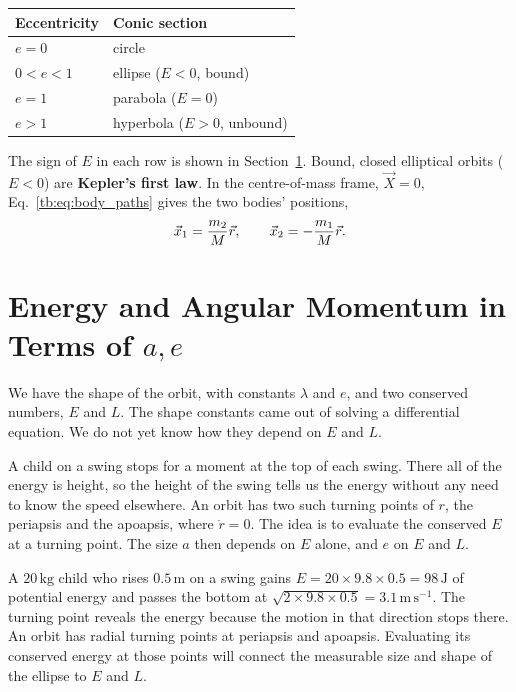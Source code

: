 	\begin{center}
		\begin{tabular}{@{}ll@{}}
			\toprule
			Eccentricity & Conic section\\
			\midrule
			$e=0$ & circle\\
			$0<e<1$ & ellipse ($E<0$, bound)\\
			$e=1$ & parabola ($E=0$)\\
			$e>1$ & hyperbola ($E>0$, unbound)\\
			\bottomrule
		\end{tabular}
	\end{center}
	The sign of $E$ in each row is shown in Section~\ref{tb:sec:EL_ae}. Bound, closed elliptical orbits ($E<0$) are \textbf{Kepler's first law}. In the centre-of-mass frame, $\vec X=0$, Eq.~\eqref{tb:eq:body_paths} gives the two bodies' positions,
	\[
	\vec x_1=\frac{m_2}{M}\vec r,\qquad \vec x_2=-\frac{m_1}{M}\vec r.
	\]
	
	\section{Energy and Angular Momentum in Terms of \texorpdfstring{$a,e$}{a,e}}
	\label{tb:sec:EL_ae}

	We have the shape of the orbit, with constants $\lambda$ and $e$, and two conserved numbers, $E$ and $L$. 	The shape constants came out of solving a differential equation. We do not yet know how they depend on $E$ and $L$.

	A child on a swing stops for a moment at the top of each swing. There all of the energy is height, so the height of the swing tells us the energy without any need to know the speed elsewhere. 	An orbit has two such turning points of $r$, the periapsis and the apoapsis, where $\dot r=0$. The idea is to evaluate the conserved $E$ at a turning point. The size $a$ then depends on $E$ alone, and $e$ on $E$ and $L$.

	A $20\,\mathrm{kg}$ child who rises $0.5\,\mathrm m$ on a swing gains $E=20\times9.8\times0.5=98\,\mathrm J$ of potential energy and passes the bottom at $\sqrt{2\times9.8\times0.5}=3.1\,\mathrm{m\,s^{-1}}$. The turning point reveals the energy because the motion in that direction stops there. An orbit has radial turning points at periapsis and apoapsis. Evaluating its conserved energy at those points will connect the measurable size and shape of the ellipse to $E$ and $L$.

